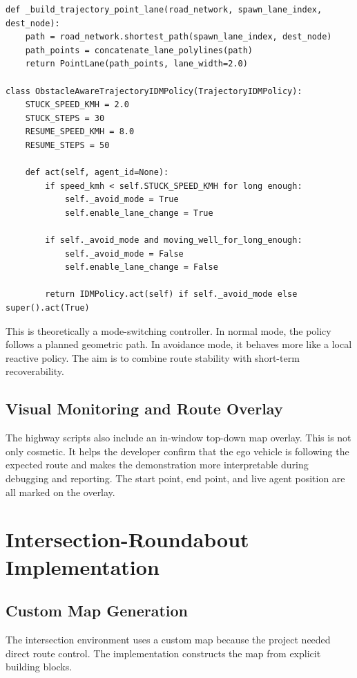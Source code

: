 \documentclass[12pt,a4paper]{report}
\begin{document}
\begin{lstlisting}[caption={Simplified logic of the highway trajectory variant.},label={lst:traj_logic},float=H]
def _build_trajectory_point_lane(road_network, spawn_lane_index, dest_node):
    path = road_network.shortest_path(spawn_lane_index, dest_node)
    path_points = concatenate_lane_polylines(path)
    return PointLane(path_points, lane_width=2.0)

class ObstacleAwareTrajectoryIDMPolicy(TrajectoryIDMPolicy):
    STUCK_SPEED_KMH = 2.0
    STUCK_STEPS = 30
    RESUME_SPEED_KMH = 8.0
    RESUME_STEPS = 50

    def act(self, agent_id=None):
        if speed_kmh < self.STUCK_SPEED_KMH for long enough:
            self._avoid_mode = True
            self.enable_lane_change = True

        if self._avoid_mode and moving_well_for_long_enough:
            self._avoid_mode = False
            self.enable_lane_change = False

        return IDMPolicy.act(self) if self._avoid_mode else super().act(True)
\end{lstlisting}

This is theoretically a mode-switching controller. In normal mode, the policy follows a planned geometric path. In avoidance mode, it behaves more like a local reactive policy. The aim is to combine route stability with short-term recoverability.

\subsection{Visual Monitoring and Route Overlay}
The highway scripts also include an in-window top-down map overlay. This is not only cosmetic. It helps the developer confirm that the ego vehicle is following the expected route and makes the demonstration more interpretable during debugging and reporting. The start point, end point, and live agent position are all marked on the overlay.

\section{Intersection-Roundabout Implementation}

\subsection{Custom Map Generation}
The intersection environment uses a custom map because the project needed direct route control. The implementation constructs the map from explicit building blocks.
\end{document}
